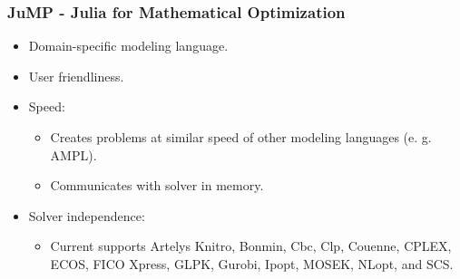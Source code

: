 \documentclass{beamer}
\begin{document}
\begin{frame}
  \frametitle{JuMP - Julia for Mathematical Optimization}

  \begin{itemize}
    \item <2-> [] Domain-specific modeling language.
    \item <3-> [] User friendliness.
    \item <4-> [] Speed:
      \begin{itemize}
        \item [] Creates problems at similar speed of other modeling languages (e. g. AMPL).
        \item [] Communicates with solver in memory.
      \end{itemize}
    \item <5-> [] Solver independence:
      \begin{itemize}
      \item [] Current supports Artelys Knitro, Bonmin, Cbc, Clp, Couenne, CPLEX, ECOS, FICO Xpress, GLPK, Gurobi, Ipopt, MOSEK, NLopt, and SCS.
      \end{itemize}
  \end{itemize}
  
\end{frame}
\end{document}
